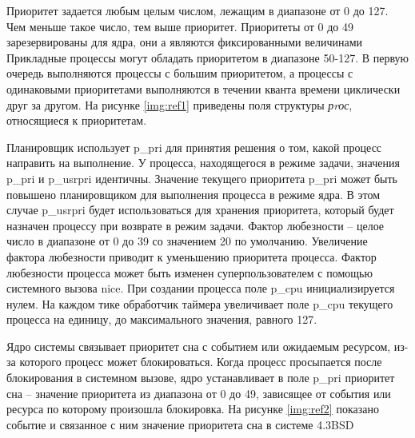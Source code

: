 Приоритет задается любым целым числом, лежащим в диапазоне от 0 до 127. 
Чем меньше такое число, тем выше приоритет. 
Приоритеты от 0 до 49 зарезервированы для ядра, они а являются фиксированными величинами
Прикладные процессы могут обладать приоритетом в диапазоне 50-127.
В первую очередь выполняются процессы с большим приоритетом,
а процессы с одинаковыми приоритетами выполняются в течении кванта
времени циклически друг за другом. 
На рисунке \ref{img:ref1} приведены поля структуры \textit{рrос},
относящиеся к приоритетам.

\begin{figure}[ht!]
\end{figure}

Планировщик использует p\_pri для принятия решения о том,
какой процесс направить на выполнение.
У процесса, находящегося в режиме задачи, значения p\_pri и p\_usrpri идентичны.
Значение текущего приоритета p\_pri может быть повышено планировщиком для выполнения процесса в режиме ядра. 
В этом случае p\_usrpri будет использоваться для хранения приоритета, который будет назначен процессу
при возврате в режим задачи. 
Фактор любезности – целое число в диапазоне от 0 до 39 со значением
20 по умолчанию. Увеличение фактора любезности приводит к уменьшению 
приоритета процесса. Фактор любезности процесса может быть
изменен суперпользователем с помощью системного вызова nice.
При создании процесса поле p\_cpu инициализируется нулем. 
На каждом тике обработчик 
таймера увеличивает поле p\_cpu текущего процесса на единицу,
до максимального значения, 
равного 127.

Ядро системы связывает приоритет сна с событием или ожидаемым ресурсом,
из-за которого процесс может блокироваться. 
Когда процесс просыпается после блокирования в системном вызове,
ядро устанавливает в поле p\_pri приоритет сна – значение приоритета
из диапазона от 0 до 49, зависящее от события или ресурса
по которому произошла блокировка. 
На рисунке \ref{img:ref2} показано 
событие и связанное с ним значение приоритета сна 
в системе 4.3BSD 

